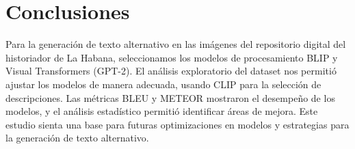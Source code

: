 \chapter{Conclusiones}\label{chapter:conclusions}

Para la generación de texto alternativo en las imágenes del repositorio digital del historiador de La Habana, seleccionamos los modelos de procesamiento BLIP y Visual Transformers (GPT-2).
El análisis exploratorio del dataset nos permitió ajustar los modelos de manera adecuada, usando CLIP para la selección de descripciones.
Las métricas BLEU y METEOR mostraron el desempeño de los modelos, y el análisis estadístico permitió identificar áreas de mejora. Este estudio sienta una base para futuras optimizaciones en modelos y estrategias para la generación de texto alternativo.

